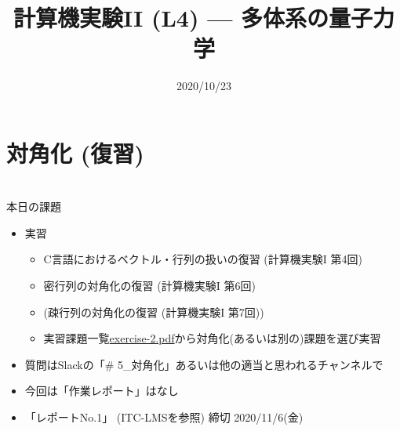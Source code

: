 \documentclass[10pt,dvipdfmx]{beamer}
\title{計算機実験II (L4) --- 多体系の量子力学}
\date{2020/10/23}
\begin{document}
\begin{frame}
  \titlepage
  \tableofcontents
\end{frame}



\section{対角化 (復習)}






\section{}
\begin{frame}[t]{本日の課題}
  \begin{itemize}
  \item 実習
    \begin{itemize}
    \item C言語におけるベクトル・行列の扱いの復習 (計算機実験I 第4回)
    \item 密行列の対角化の復習 (計算機実験I 第6回)
    \item (疎行列の対角化の復習 (計算機実験I 第7回))
    \item 実習課題一覧\href{https://github.com/todo-group/ComputerExperiments/releases/tag/2020a-computer2}{exercise-2.pdf}から対角化(あるいは別の)課題を選び実習
    \end{itemize}
  \item 質問はSlackの「\# 5\_対角化」あるいは他の適当と思われるチャンネルで
  \item 今回は「作業レポート」はなし
  \item 「レポートNo.1」 (ITC-LMSを参照) 締切 2020/11/6(金)
  \end{itemize}
\end{frame}
\end{document}
